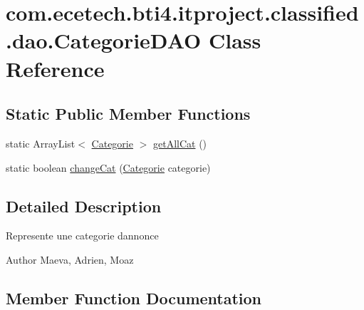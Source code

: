\hypertarget{classcom_1_1ecetech_1_1bti4_1_1itproject_1_1classified_1_1dao_1_1_categorie_d_a_o}{}\section{com.\+ecetech.\+bti4.\+itproject.\+classified.\+dao.\+Categorie\+D\+AO Class Reference}
\label{classcom_1_1ecetech_1_1bti4_1_1itproject_1_1classified_1_1dao_1_1_categorie_d_a_o}
\subsection*{Static Public Member Functions}
\begin{DoxyCompactItemize}
\item 
static Array\+List$<$ \hyperlink{classcom_1_1ecetech_1_1bti4_1_1itproject_1_1classified_1_1beans_1_1_categorie}{Categorie} $>$ \hyperlink{classcom_1_1ecetech_1_1bti4_1_1itproject_1_1classified_1_1dao_1_1_categorie_d_a_o_a3e7fe47e89b6a9fc25fd8037d3f5acf7}{get\+All\+Cat} ()
\item 
static boolean \hyperlink{classcom_1_1ecetech_1_1bti4_1_1itproject_1_1classified_1_1dao_1_1_categorie_d_a_o_a003d6a6dce5a0c96895c78547931a5ca}{change\+Cat} (\hyperlink{classcom_1_1ecetech_1_1bti4_1_1itproject_1_1classified_1_1beans_1_1_categorie}{Categorie} categorie)
\end{DoxyCompactItemize}


\subsection{Detailed Description}
Represente une categorie d\textquotesingle{}annonce \begin{DoxyAuthor}{Author}
Maeva, Adrien, Moaz 
\end{DoxyAuthor}


\subsection{Member Function Documentation}
